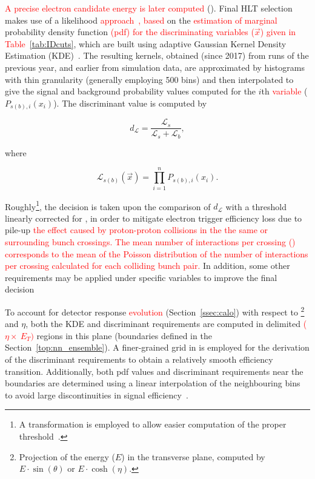   


\textcolor{red}{A precise electron candidate energy is later computed} (\hltcalo). Final HLT selection makes use of a likelihood
\textcolor{red}{approach~\cite{ATL-COM-PHYS-2017-1012,ATLAS-PERF-2017-01-002}, based} on the \textcolor{red}{estimation of marginal} probability density function \textcolor{red}{(pdf) for the discriminating variables ($\vec{x}$) given in Table~\ref{tab:IDcuts}}, which are built using adaptive Gaussian Kernel Density Estimation (KDE)~\cite{Silverman2018,TMVA}. The
resulting kernels, obtained (since 2017) from runs of the previous year, and
earlier from simulation data, are approximated by histograms with thin
granularity (generally employing 500 bins) and then interpolated to give the
signal and background probability values computed for the $i$th \textcolor{red}{variable}
($P_{s(b),i}(x_i)$). The discriminant value is computed by

\begin{equation}
  d_{\mathcal{L}} = \frac{\mathcal{L}_{s}}{\mathcal{L}_{s} + \mathcal{L}_{b}},
\end{equation}
  
\noindent where
  
\begin{equation}
\mathcal{L}_{s(b)}(\vec{x}) = \prod_{i=1}^{n} P_{s(b),i}(x_i).
\label{eq:likelihoods}
\end{equation}



\noindent Roughly\footnote{A transformation is employed to allow
easier computation of the proper threshold~\cite{aaboud2019electron}.},
the decision is taken upon the comparison of $d_{\mathcal{L}}$ with a
threshold linearly corrected for \avgmu{}, in order to mitigate electron trigger
efficiency loss due to pile-up \textcolor{red}{the effect caused by proton-proton collisions in the the same or surrounding bunch crossings. The mean number of interactions per crossing (\avgmu{}) corresponds to the
mean of the Poisson distribution of the number of interactions per crossing calculated for each colliding bunch pair.} In addition, some other requirements may be
applied under specific variables to improve the final
decision~\cite{aaboud2019electron}

To account for detector response \textcolor{red}{evolution} (Section~\ref{ssec:calo}) with
respect to \Et\footnote{Projection of the energy ($E$) in the transverse plane,
computed by $E\cdot\sin(\theta)$ or $E\cdot\cosh(\eta)$.} and
$\eta$, both the KDE and discriminant requirements are computed in delimited \textcolor{red}{($\eta\times~E_{T})$}
regions in this plane (boundaries defined in the Section~\ref{top:nn_ensemble}).
A finer-grained grid in \Et is employed for the derivation of the discriminant
requirements to obtain a relatively smooth efficiency transition. Additionally,
both pdf values and discriminant requirements near the boundaries are determined
using a linear interpolation of the neighbouring bins to avoid large
discontinuities in signal efficiency~\cite{aaboud2019electron}.


